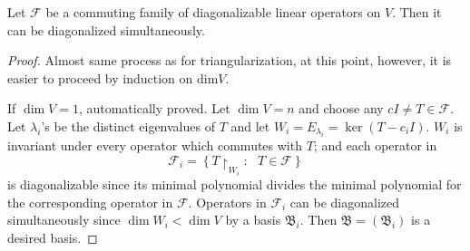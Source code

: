 \begin{theorem}Let $\mathscr F$ be a commuting family of diagonalizable linear operators on $V$. Then it can be diagonalized simultaneously.
\end{theorem}
\begin{proof}
Almost same process as for triangularization, at this point, however, it is easier to proceed by induction on dim$V$.

If $\operatorname{dim}V = 1$, automatically proved. Let $\operatorname{dim}V = n$ and choose any $cI \ne T\in\mathscr F$. Let $\lambda_i$'s be the distinct eigenvalues of $T$ and let $W_i = E_{\lambda_i} = \ker (T-c_i I).$ $W_i$ is invariant under every operator which commutes with $T$; and each operator in $$\mathscr F_i = \left\{T\upharpoonright_{W_i} : ~~~ T\in\mathscr F \right\}$$ is diagonalizable since its minimal polynomial divides the minimal polynomial for the corresponding operator in $\mathscr F$. Operators in $\mathscr F_i$ can be diagonalized simultaneously since $\operatorname{dim}W_i < \operatorname{dim}V$ by a basis $\mathfrak B_i$. Then $\mathfrak B = (\mathfrak B_i)$ is a desired basis.
\end{proof}